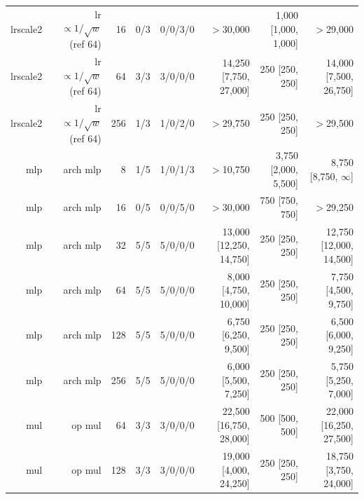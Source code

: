 \begin{table}[t]
{\begin{tabular}{rrrrrrrr}
lrscale2 & lr $\propto 1/\sqrt{w}$ (ref 64) & 16 & 0/3 & 0/0/3/0 & $>$30,000 & 1,000 [1,000, 1,000] & $>$29,000 \\
lrscale2 & lr $\propto 1/\sqrt{w}$ (ref 64) & 64 & 3/3 & 3/0/0/0 & 14,250 [7,750, 27,000] & 250 [250, 250] & 14,000 [7,500, 26,750] \\
lrscale2 & lr $\propto 1/\sqrt{w}$ (ref 64) & 256 & 1/3 & 1/0/2/0 & $>$29,750 & 250 [250, 250] & $>$29,500 \\
mlp & arch mlp & 8 & 1/5 & 1/0/1/3 & $>$10,750 & 3,750 [2,000, 5,500] & 8,750 [8,750, $\infty$] \\
mlp & arch mlp & 16 & 0/5 & 0/0/5/0 & $>$30,000 & 750 [750, 750] & $>$29,250 \\
mlp & arch mlp & 32 & 5/5 & 5/0/0/0 & 13,000 [12,250, 14,750] & 250 [250, 250] & 12,750 [12,000, 14,500] \\
mlp & arch mlp & 64 & 5/5 & 5/0/0/0 & 8,000 [4,750, 10,000] & 250 [250, 250] & 7,750 [4,500, 9,750] \\
mlp & arch mlp & 128 & 5/5 & 5/0/0/0 & 6,750 [6,250, 9,500] & 250 [250, 250] & 6,500 [6,000, 9,250] \\
mlp & arch mlp & 256 & 5/5 & 5/0/0/0 & 6,000 [5,500, 7,250] & 250 [250, 250] & 5,750 [5,250, 7,000] \\
mul & op mul & 64 & 3/3 & 3/0/0/0 & 22,500 [16,750, 28,000] & 500 [500, 500] & 22,000 [16,250, 27,500] \\
mul & op mul & 128 & 3/3 & 3/0/0/0 & 19,000 [4,000, 24,250] & 250 [250, 250] & 18,750 [3,750, 24,000] \\
\bottomrule
\end{tabular}}
\end{table}
